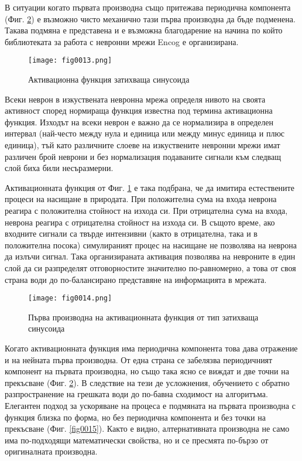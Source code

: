 В ситуации когато първата производна също притежава периодична компонента (Фиг. \ref{fig0014}) е възможно чисто механично тази първа производна да бъде подменена. Такава подмяна е представена и е възможна благодарение на начина по който библиотеката за работа с невронни мрежи Encog е организирана.

\begin{figure}[H]
  \centering
  \texttt{[image: fig0013.png]}
  \caption{Активационна функция затихваща синусоида}
\label{fig0013}
\end{figure}

Всеки неврон в изкуствената невронна мрежа определя нивото на своята активност според нормираща функция известна под термина активационна функция. Изходът на всеки неврон е важно да се нормализира в определен интервал (най-често между нула и единица или между минус единица и плюс единица), тъй като различните слоеве на изкуствените невронни мрежи имат различен брой неврони и без нормализация подаваните сигнали към следващ слой биха били несъразмерни.

Активационната функция от Фиг. \ref{fig0013} е така подбрана, че да имитира естествените процеси на насищане в природата. При положителна сума на входа неврона реагира с положителна стойност на изхода си. При отрицателна сума на входа, неврона реагира с отрицателна стойност на изхода си. В същото време, ако входните сигнали са твърде интензивни (както в отрицателна, така и в положителна посока) симулираният процес на насищане не позволява на неврона да излъчи сигнал. Така организираната активация позволява на невроните в един слой да си разпределят отговорностите значително по-равномерно, а това от своя страна води до по-балансирано представяне на информацията в мрежата.

\begin{figure}[H]
  \centering
  \texttt{[image: fig0014.png]}
  \caption{Първа производна на активационната функция от тип затихваща синусоида}
\label{fig0014}
\end{figure}

Когато активационната функция има периодична компонента това дава отражение и на нейната първа производна. От една страна се забелязва периодичният компонент на първата производна, но също така ясно се виждат и две точни на прекъсване (Фиг. \ref{fig0014}). В следствие на тези де усложнения, обучението с обратно разпространение на грешката води до по-бавна сходимост на алгоритъма. Елегантен подход за ускоряване на процеса е подмяната на първата производна с функция близка по форма, но без периодична компонента и без точки на прекъсване (Фиг. \ref{fig0015}). Както е видно, алтернативната производна не само има по-подходящи математически свойства, но и се пресмята по-бързо от оригиналната производна.

